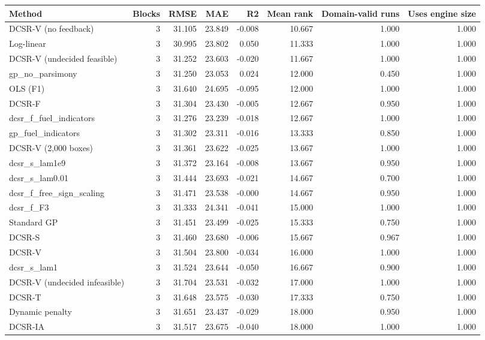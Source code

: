 \begin{tabular}{lrrrrrrr}
\toprule
Method & Blocks & RMSE & MAE & R2 & Mean rank & Domain-valid runs & Uses engine size \\
\midrule
DCSR-V (no feedback) & 3 & 31.105 & 23.849 & -0.008 & 10.667 & 1.000 & 1.000 \\
Log-linear & 3 & 30.995 & 23.802 & 0.050 & 11.333 & 1.000 & 1.000 \\
DCSR-V (undecided feasible) & 3 & 31.252 & 23.603 & -0.020 & 11.667 & 1.000 & 1.000 \\
gp\_no\_parsimony & 3 & 31.250 & 23.053 & 0.024 & 12.000 & 0.450 & 1.000 \\
OLS (F1) & 3 & 31.640 & 24.695 & -0.095 & 12.000 & 1.000 & 1.000 \\
DCSR-F & 3 & 31.304 & 23.430 & -0.005 & 12.667 & 0.950 & 1.000 \\
dcsr\_f\_fuel\_indicators & 3 & 31.276 & 23.239 & -0.018 & 12.667 & 1.000 & 1.000 \\
gp\_fuel\_indicators & 3 & 31.302 & 23.311 & -0.016 & 13.333 & 0.850 & 1.000 \\
DCSR-V (2,000 boxes) & 3 & 31.361 & 23.622 & -0.025 & 13.667 & 1.000 & 1.000 \\
dcsr\_s\_lam1e9 & 3 & 31.372 & 23.164 & -0.008 & 13.667 & 0.950 & 1.000 \\
dcsr\_s\_lam0.01 & 3 & 31.444 & 23.693 & -0.021 & 14.667 & 0.700 & 1.000 \\
dcsr\_f\_free\_sign\_scaling & 3 & 31.471 & 23.538 & -0.000 & 14.667 & 0.950 & 1.000 \\
dcsr\_f\_F3 & 3 & 31.333 & 24.341 & -0.041 & 15.000 & 1.000 & 1.000 \\
Standard GP & 3 & 31.451 & 23.499 & -0.025 & 15.333 & 0.750 & 1.000 \\
DCSR-S & 3 & 31.460 & 23.680 & -0.006 & 15.667 & 0.967 & 1.000 \\
DCSR-V & 3 & 31.504 & 23.800 & -0.034 & 16.000 & 1.000 & 1.000 \\
dcsr\_s\_lam1 & 3 & 31.524 & 23.644 & -0.050 & 16.667 & 0.900 & 1.000 \\
DCSR-V (undecided infeasible) & 3 & 31.704 & 23.531 & -0.032 & 17.000 & 1.000 & 1.000 \\
DCSR-T & 3 & 31.648 & 23.575 & -0.030 & 17.333 & 0.750 & 1.000 \\
Dynamic penalty & 3 & 31.651 & 23.437 & -0.029 & 18.000 & 0.950 & 1.000 \\
DCSR-IA & 3 & 31.517 & 23.675 & -0.040 & 18.000 & 1.000 & 1.000 \\

\end{tabular}
